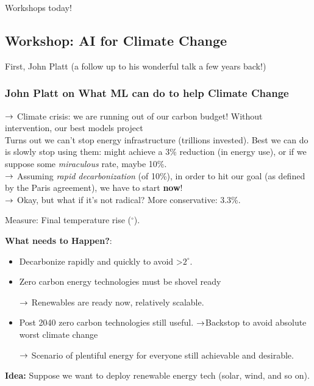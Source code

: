 Workshops today!

\subsection{Workshop: AI for Climate Change}

First, John Platt (a follow up to his wonderful talk a few years back!)

\subsubsection{John Platt on What ML can do to help Climate Change}


$\rightarrow$ Climate crisis: we are running out of our carbon budget! Without intervention, our best models project \\

Turns out we can't stop energy infrastructure (trillions invested). Best we can do is slowly stop using them: might achieve a 3\% reduction (in energy use), or if we suppose some {\it miraculous} rate, maybe 10\%.\\

$\rightarrow$ Assuming {\it rapid decarbonization} (of 10\%), in order to hit our goal (as defined by the Paris agreement), we have to start {\bf now}! \\

$\rightarrow$ Okay, but what if it's not radical? More conservative: 3.3\%.

Measure: Final temperature rise ($^\circ$).

{\bf What needs to Happen?}:
\begin{itemize}
    \item Decarbonize rapidly and quickly to avoid >$2^\circ$.
    \item Zero carbon energy technologies must be shovel ready
    
    $\rightarrow$ Renewables are ready now, relatively scalable.
    
    \item Post 2040 zero carbon technologies still useful.
    $\rightarrow$Backstop to avoid absolute worst climate change
    
    $\rightarrow$ Scenario of plentiful energy for everyone still achievable and desirable.
    
    
\end{itemize}


{\bf Idea:} Suppose we want to deploy renewable energy tech (solar, wind, and so on). \\

